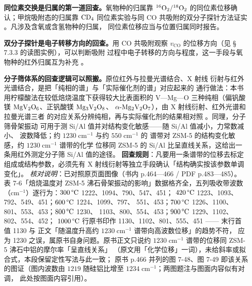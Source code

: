 \begin{crosscheck}
\textbf{同位素交换是归属的第一道回查。}氧物种的归属靠
$^{16}\ce{O2}/^{18}\ce{O2}$ 的同位素位移确认；甲烷吸附态的归属靠
$\ce{CD4}$ 同位素实验与同 CO 共吸附的双分子探针方法证实
。凡涉及含氧或含氢物种的归属，
同位素位移应当与位置归属同时报告。

\textbf{双分子探针是电子转移方向的回查。}用 CO 共吸附观察
$v_{\mathrm{CO}}$ 的位移方向（见 \S\,7.3.3 的读图实例），可以判断吸附
过程中电子转移的方向与程度，这一手段与氧物种的红外归属互为补充
。

\textbf{分子筛体系的回查逻辑可以照搬。}原位红外与拉曼光谱结合、X 射线
衍射与红外光谱结合，是把「纯相的谱」与「实际催化剂的谱」对应起来的
通行做法：本书用柠檬酸法在较低焙烧温度下获得较大比表面积的
V—Mg—O 三种纯相（偏钒酸镁 $\ce{MgV2O6}$、正钒酸镁 $\ce{Mg3V2O8}$、
$\alpha\text{-}\ce{Mg2V2O7}$），由 X 射线衍射、红外光谱和拉曼光谱三者
的对应关系分辨纯相，再与实际催化剂的结果相对照
。同理，分子筛骨架振动
可用于测 Si/Al 值并对结构变化敏感——随 Si/Al 值减小，力常数减小、
波数降低；约 $1230\;\mathrm{cm^{-1}}$ 与约 $550\;\mathrm{cm^{-1}}$ 的
谱带对 ZSM-5 的结构变化敏感，约 $1230\;\mathrm{cm^{-1}}$ 谱带的化学
位移同 ZSM-5 的 Si/Al 比呈直线关系，这给出一条用红外测定分子筛 Si/Al
值的途径。
\textbf{回查规则}：凡要用一条谱带的位移去标定组成或结构参数，必须先有
X 射线衍射等独立手段确认「结构确实按该参数单调变化」。
\emph{核对说明}：已对照原页面图像（书内 p.464—466 / PDF p.483—485）。
表 7-6「焙烧温度对 ZSM-5 沸石骨架振动的影响」数据格齐全，五列吸收带波数
（$\mathrm{cm^{-1}}$）逐行为：$300\,\degC$ 1222、1094、790、547、451；
$420\,\degC$ 1223、1093、792、549、451；$600\,\degC$ 1224、1099、797、
551、453；$700\,\degC$ 1226、1100、801、553、453；$800\,\degC$ 1230、
1103、800、554、453；$900\,\degC$ 1229、1102、802、554、452；
$1000\,\degC$ 行原书印作 1130、1102、801、555、451 —— 末行首值 1130 与
正文「随温度升高约 $1230\;\mathrm{cm^{-1}}$ 谱带向高波数位移」的趋势不符，
应为 1230 之误，属原书自身问题。原书正文只说约
$1230\;\mathrm{cm^{-1}}$ 谱带的位移同 ZSM-5 沸石中铝的摩尔率「呈直线关系」
（原文用「化学位移」一词），未给斜率或拟合式，本段保留定性写法与此一致；
原书 p.466 并列的图 7-48、图 7-49 即该关系的图证（图内波数由
$1219$ 随硅铝比增至 $1234\;\mathrm{cm^{-1}}$；两图题注与图面内容似有对调，
此处按图面内容引用）。
\end{crosscheck}


